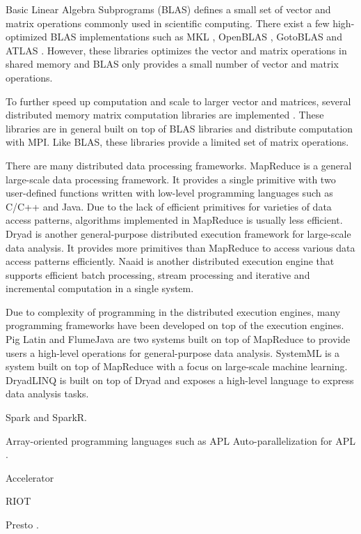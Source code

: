 Basic Linear Algebra Subprograms (BLAS) defines a small set of vector and
matrix operations commonly used in scientific computing. There exist a few
high-optimized BLAS implementations such as MKL \cite{mkl}, OpenBLAS
\cite{openblas}, GotoBLAS \cite{Goto} and ATLAS \cite{atlas}. However, these
libraries optimizes the vector and matrix operations in shared memory and BLAS
only provides a small number of vector and matrix operations.

To further speed up computation and scale to larger vector and matrices,
several distributed memory matrix computation libraries are implemented
\cite{trilinos, petsc, elemental}. These libraries are in general built on
top of BLAS libraries and distribute computation with MPI. Like BLAS, these
libraries provide a limited set of matrix operations.

There are many distributed data processing frameworks.
MapReduce \cite{mapreduce} is a general large-scale data processing framework.
It provides a single primitive with two user-defined functions written with
low-level programming languages such as C/C++ and Java. Due to the lack of
efficient primitives for varieties of data access patterns, algorithms
implemented in MapReduce is usually less efficient. Dryad \cite{dryad} is
another general-purpose distributed execution framework for large-scale data
analysis. It provides more primitives than MapReduce to access various data
access patterns efficiently. Naaid \cite{naaid} is another distributed execution
engine that supports efficient batch processing, stream processing and iterative
and incremental computation in a single system.

Due to complexity of programming in the distributed execution engines, many
programming frameworks have been developed on top of the execution engines.
Pig Latin \cite{pig} and FlumeJava \cite{flumejava} are two systems built
on top of MapReduce to provide users a high-level operations for general-purpose
data analysis. SystemML \cite{systemml} is a system built on top of MapReduce
with a focus on large-scale machine learning.
DryadLINQ \cite{dryadlinq} is built on top of Dryad and exposes a high-level
language to express data analysis tasks.

Spark \cite{spark} and SparkR.

Array-oriented programming languages such as APL
Auto-parallelization for APL \cite{Ching12}.

Accelerator \cite{accelerator}

RIOT \cite{riot}

Presto \cite{presto}.
